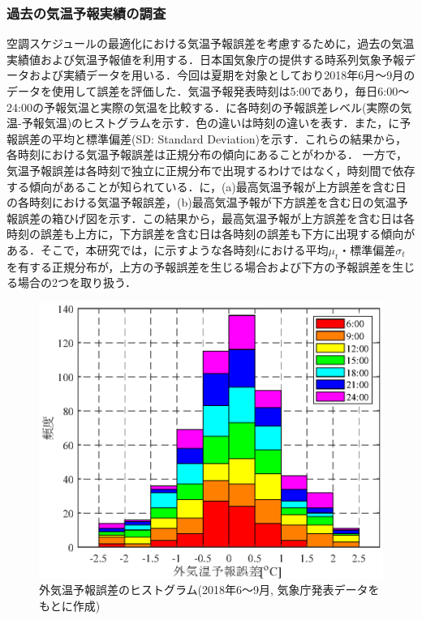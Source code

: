 \subsubsection{過去の気温予報実績の調査}
空調スケジュールの最適化における気温予報誤差を考慮するために，過去の気温実績値および気温予報値を利用する．日本国気象庁の提供する時系列気象予報データ\cite{JMAforecast}および実績データ\cite{JMAactual}を用いる．今回は夏期を対象としており2018年6月～9月のデータを使用して誤差を評価した．気温予報発表時刻は5:00であり，毎日6:00～24:00の予報気温と実際の気温を比較する．に各時刻の予報誤差レベル(実際の気温-予報気温)のヒストグラムを示す．色の違いは時刻の違いを表す．また，に予報誤差の平均と標準偏差(SD: Standard Deviation)を示す．これらの結果から，各時刻における気温予報誤差は正規分布の傾向にあることがわかる．
一方で，気温予報誤差は各時刻で独立に正規分布で出現するわけではなく，時刻間で依存する傾向があることが知られている．に，(a)最高気温予報が上方誤差を含む日の各時刻における気温予報誤差，(b)最高気温予報が下方誤差を含む日の気温予報誤差の箱ひげ図を示す．この結果から，最高気温予報が上方誤差を含む日は各時刻の誤差も上方に，下方誤差を含む日は各時刻の誤差も下方に出現する傾向がある．そこで，本研究では，に示すような各時刻$t$における平均$μ_t$・標準偏差$σ_t$を有する正規分布が，上方の予報誤差を生じる場合および下方の予報誤差を生じる場合の2つを取り扱う．


\begin{figure}[t]
    \centerline{\includegraphics[scale=0.7]{fig/robust_temperror_histogram.eps}}
    \caption{外気温予報誤差のヒストグラム(2018年6～9月, 気象庁発表データ\cite{JMAforecast, JMAactual}をもとに作成)}
    \label{fig::robust_temperror_histogram}
\end{figure}

